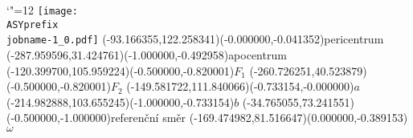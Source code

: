 \setlength{\unitlength}{1pt}
\makeatletter%
\let\ASYencoding\f@encoding%
\let\ASYfamily\f@family%
\let\ASYseries\f@series%
\let\ASYshape\f@shape%
\makeatother%
{\catcode`"=12%
\texttt{[image: \\ASYprefix\\jobname-1\_0.pdf]}%
}%
\color{ASYcolor}
\fontsize{12.000000}{14.400000}\selectfont
\usefont{\ASYencoding}{\ASYfamily}{\ASYseries}{\ASYshape}%
\ASYalign(-93.166355,122.258341)(-0.000000,-0.041352){{\footnotesize pericentrum}}%
\color{ASYcolor}
\fontsize{12.000000}{14.400000}\selectfont
\ASYalign(-287.959596,31.424761)(-1.000000,-0.492958){{\footnotesize apocentrum}}%
\color{ASYcolor}
\fontsize{12.000000}{14.400000}\selectfont
\ASYalign(-120.399700,105.959224)(-0.500000,-0.820001){$F_1$}%
\color{ASYcolor}
\fontsize{12.000000}{14.400000}\selectfont
\ASYalign(-260.726251,40.523879)(-0.500000,-0.820001){$F_2$}%
\color{ASYcolor}
\fontsize{12.000000}{14.400000}\selectfont
\ASYalign(-149.581722,111.840066)(-0.733154,-0.000000){$a$}%
\color{ASYcolor}
\fontsize{12.000000}{14.400000}\selectfont
\ASYalign(-214.982888,103.655245)(-1.000000,-0.733154){$b$}%
\color{ASYcolor}
\fontsize{12.000000}{14.400000}\selectfont
\ASYalign(-34.765055,73.241551)(-0.500000,-1.000000){{\footnotesize referenční směr}}%
\color{ASYcolor}
\fontsize{12.000000}{14.400000}\selectfont
\ASYalign(-169.474982,81.516647)(0.000000,-0.389153){$\omega$}%
